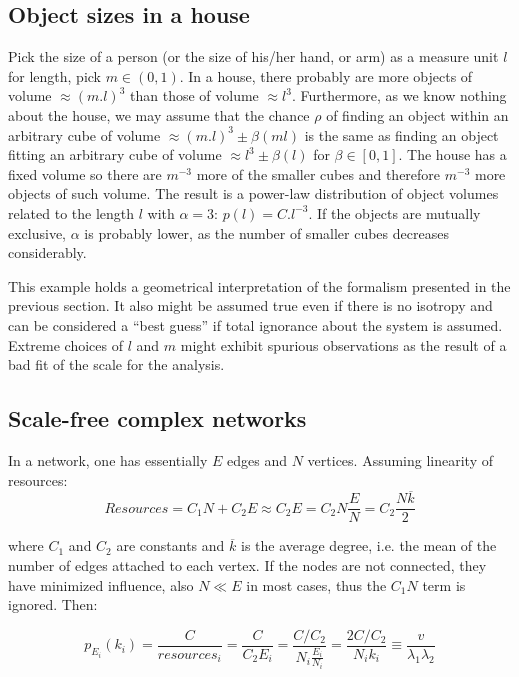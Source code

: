 \documentclass[10pt,letterpaper]{article}
\begin{document}
\subsection{Object sizes in a house}\label{sec:siz}
Pick the size of a person (or the size of his/her hand, or  arm)
as a measure unit $l$ for length, pick $m \in (0,1)$.
In a house, there probably are more objects
of volume $\approx (m.l)^3$ 
than those of volume $\approx l^3$.
Furthermore, as we know nothing about the house,
we may assume that the chance $\rho$ of finding an object
within an arbitrary cube of volume $\approx (m.l)^3 \pm \beta(ml)$
is the same as finding an object fitting an
arbitrary cube of volume $\approx l^3 \pm \beta(l)$ for $\beta \in [0,1]$.
The house has a fixed volume so there are $m^{-3}$ more of
the smaller cubes and therefore $m^{-3}$ more objects of such
volume. 
The result is a power-law distribution of object volumes
related to the length $l$ with $\alpha=3$:
$p(l)=C.l^{-3}$.
If the objects are mutually exclusive,
$\alpha$ is probably lower, as the number of smaller
cubes decreases considerably.

This example holds a geometrical
interpretation of the formalism presented in the previous section.
It also might be assumed true even if there is no isotropy
and can be considered a ``best guess'' if total ignorance
about the system is assumed. 
Extreme choices of $l$ and $m$
might exhibit spurious observations
as the result of a bad fit of the scale for the analysis.

\subsection{Scale-free complex networks}

In a network, one has essentially $E$ edges and $N$ vertices.
Assuming linearity of resources:
\begin{equation}\label{eq:nre}
	Resources=C_1 N + C_2 E \approx C_2 E = C_2 N \frac{E}{N} = C_2 \frac{N \overline{k}}{2}
\end{equation}

\noindent where $C_1$ and $C_2$ are constants and $\overline{k}$ is
the average degree, i.e. the mean of the number of edges attached to each vertex.
If the nodes are not connected, they have minimized influence, also $N \ll E$ in most cases, thus the $C_1 N$ term is ignored.
Then:

\begin{equation}\label{eq:eqf}
	p_{E_i}(k_i)=\frac{C}{resources_i}=\frac{C}{C_2 E_i}=\frac{C/C_2}{N_i \frac{E_i}{N_i}}=\frac{2C/C_2}{N_i k_i} \equiv \frac{v}{\lambda_1   \lambda_2}
\end{equation}
\end{document}
